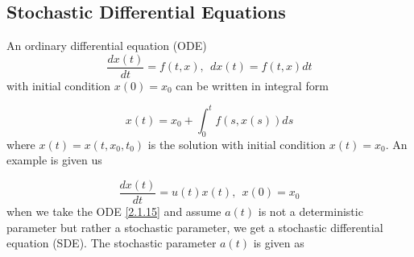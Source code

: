 \documentclass[a4 paper, 12pt]{report}
\theoremstyle{plain}
\begin{document}


\subsection{Stochastic Differential Equations}
An ordinary differential equation (ODE)
\begin{equation}\label{2.13}
\frac{dx(t)}{dt} = f(t,x),~~dx(t) = f(t,x)dt
\end{equation}
with initial condition $x(0) = x_0$ can be written in integral form


\begin{equation}\label{2.14}
x(t) = x_0+\int_0^tf(s,x(s))ds
\end{equation}
where $x(t) = x(t,x_0,t_0)$ is the solution with initial condition $x(t) = x_0$. An example is given us

\begin{equation}\label{2.1.15}
\frac{dx(t)}{dt} = u(t)x(t),~~x(0) = x_0
\end{equation}
when we take the ODE \eqref{2.1.15} and assume $a(t)$ is not a deterministic parameter but rather a stochastic parameter, we get a stochastic differential equation (SDE). The stochastic parameter $a(t)$ is given as
\end{document}
